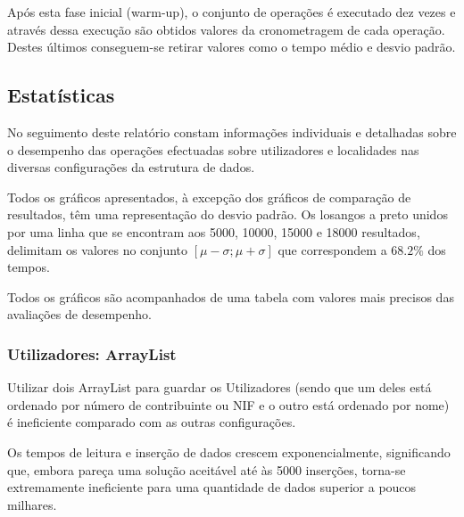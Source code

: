 \documentclass[a5paper,twocolumn, 11pt]{article}
\def\hyph{-\penalty0\hskip0pt\relax}
\begin{document}
Após esta fase inicial (warm\hyph{}up), o conjunto de operações é executado dez vezes e através dessa execução são obtidos valores da cronometragem de cada operação. Destes últimos conseguem-se retirar valores como o tempo médio e desvio padrão.

\clearpage
\subsection{Estatísticas}
No seguimento deste relatório constam informações individuais e detalhadas sobre o desempenho das operações efectuadas sobre utilizadores e localidades nas diversas configurações da estrutura de dados.

Todos os gráficos apresentados, à excepção dos gráficos de comparação de resultados, têm uma representação do desvio padrão. Os losangos a preto unidos por uma linha que se encontram aos 5000, 10000, 15000 e 18000 resultados, delimitam os valores no conjunto $[\mu-\sigma; \mu+\sigma]$ que correspondem a $68.2\%$ dos tempos.

Todos os gráficos são acompanhados de uma tabela com valores mais precisos das avaliações de desempenho.


\subsubsection{Utilizadores: ArrayList}
Utilizar dois ArrayList para guardar os Utilizadores (sendo que um deles está ordenado por número de contribuinte ou NIF e o outro está ordenado por nome) é ineficiente comparado com as outras configurações.

Os tempos de leitura e inserção de dados crescem exponencialmente, significando que, embora pareça uma solução aceitável até às 5000 inserções, torna-se extremamente ineficiente para uma quantidade de dados superior a poucos milhares.
\end{document}
